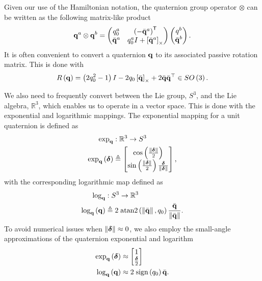 Given our use of the Hamiltonian notation, the quaternion group operator
$\otimes$ can be written as the following matrix-like product
\begin{equation}
	\boldsymbol{\mathrm{q}}^a \otimes \boldsymbol{\mathrm{q}}^b = \begin{pmatrix} q_0^a & \left(-\bar{\boldsymbol{\mathrm{q}}}^{a}\right)^{\mathsf{T}} \\ \bar{\boldsymbol{\mathrm{q}}}^a & q^a_0 I + \left[ \bar{\boldsymbol{\mathrm{q}}}^a \right]_{\times} \end{pmatrix}
	\begin{pmatrix} q^b \\ \bar{\boldsymbol{\mathrm{q}}}^b\end{pmatrix}.
\end{equation}
It is often convenient to convert a quaternion $\boldsymbol{\mathrm{q}}$ to its associated passive rotation matrix.  This is done with
\begin{equation}
\label{eq:R_from_q}
R\left(\boldsymbol{\mathrm{q}}\right)=\left(2q_{0}^{2}-1\right)I-2q_{0}\left[ \bar{\boldsymbol{\mathrm{q}}} \right]_{\times}+2\bar{\boldsymbol{\mathrm{q}}}\bar{\boldsymbol{\mathrm{q}}}^{\top}\in SO\left(3\right).
\end{equation}

We also need to frequently convert between the Lie group, $S^3$, and the Lie
algebra, $\mathbb{R}^3$, which enables us to operate in a vector space. This is done with the
exponential and logarithmic mappings. The exponential mapping for a unit quaternion is defined as
\begin{align}
\exp_{\boldsymbol{\mathrm{q}}} & :\mathbb{R}^{3}\rightarrow S^3\nonumber \\
\exp_{\boldsymbol{\mathrm{q}}}\left(\boldsymbol{\mathrm{\delta}}\right) & \triangleq\begin{bmatrix}\cos\left(\frac{\lVert\boldsymbol{\mathrm{\delta}}\rVert}{2}\right)\\
\sin\left(\frac{\lVert\boldsymbol{\mathrm{\delta}}\rVert}{2}\right)\frac{\boldsymbol{\mathrm{\delta}}}{\lVert\boldsymbol{\mathrm{\delta}}\rVert}
\end{bmatrix},\label{eqn:exponential_map}
\end{align}
with the corresponding logarithmic map defined as
\begin{align}
\log_{\boldsymbol{\mathrm{q}}} & :S^3\rightarrow \mathbb{R}^{3}\nonumber \\
\log_{\boldsymbol{\mathrm{q}}}\left(\boldsymbol{\mathrm{q}}\right) & \triangleq2\;\mathrm{atan2}\left(\left\Vert \bar{\boldsymbol{\mathrm{q}}}\right\Vert ,q_{0}\right)\frac{\bar{\boldsymbol{\mathrm{q}}}}{\left\Vert \bar{\boldsymbol{\mathrm{q}}}\right\Vert }.\label{eqn:log_map}
\end{align}
To avoid numerical issues when $\left\Vert \boldsymbol{\mathrm{\delta}}\right\Vert\approx0$, we also employ the small-angle approximations of the quaternion exponential and logarithm
\begin{align}
\exp_{\boldsymbol{\mathrm{q}}}\left(\boldsymbol{\mathrm{\delta}}\right) & \approx\begin{bmatrix}1\\
\frac{\boldsymbol{\mathrm{\delta}}}{2}
\end{bmatrix}\label{eq:quaternion_exp_approx}\\
\log_{\boldsymbol{\mathrm{q}}}\left(\boldsymbol{\mathrm{q}}\right) & \approx2\;\textrm{sign}\left(q_{0}\right)\bar{\boldsymbol{\mathrm{q}}}.\label{eq:quaternion_log_approx}
\end{align}

